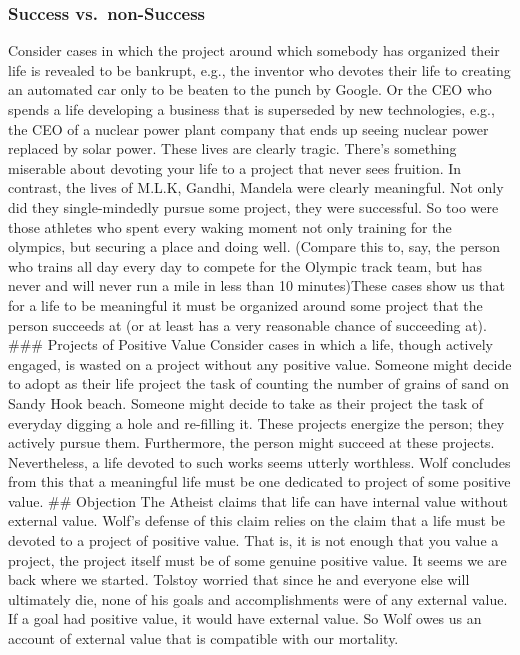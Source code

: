 \documentclass[]{article}
\begin{document}
\subsubsection{Success vs.~non-Success}\label{success-vs.non-success}

Consider cases in which the project around which somebody has organized
their life is revealed to be bankrupt, e.g., the inventor who devotes
their life to creating an automated car only to be beaten to the punch
by Google. Or the CEO who spends a life developing a business that is
superseded by new technologies, e.g., the CEO of a nuclear power plant
company that ends up seeing nuclear power replaced by solar power. These
lives are clearly tragic. There's something miserable about devoting
your life to a project that never sees fruition. In contrast, the lives
of M.L.K, Gandhi, Mandela were clearly meaningful. Not only did they
single-mindedly pursue some project, they were successful. So too were
those athletes who spent every waking moment not only training for the
olympics, but securing a place and doing well. (Compare this to, say,
the person who trains all day every day to compete for the Olympic track
team, but has never and will never run a mile in less than 10
minutes)These cases show us that for a life to be meaningful it must be
organized around some project that the person succeeds at (or at least
has a very reasonable chance of succeeding at). \#\#\# Projects of
Positive Value Consider cases in which a life, though actively engaged,
is wasted on a project without any positive value. Someone might decide
to adopt as their life project the task of counting the number of grains
of sand on Sandy Hook beach. Someone might decide to take as their
project the task of everyday digging a hole and re-filling it. These
projects energize the person; they actively pursue them. Furthermore,
the person might succeed at these projects. Nevertheless, a life devoted
to such works seems utterly worthless. Wolf concludes from this that a
meaningful life must be one dedicated to project of some positive value.
\#\# Objection The Atheist claims that life can have internal value
without external value. Wolf's defense of this claim relies on the claim
that a life must be devoted to a project of positive value. That is, it
is not enough that you value a project, the project itself must be of
some genuine positive value. It seems we are back where we started.
Tolstoy worried that since he and everyone else will ultimately die,
none of his goals and accomplishments were of any external value. If a
goal had positive value, it would have external value. So Wolf owes us
an account of external value that is compatible with our mortality.
\end{document}

